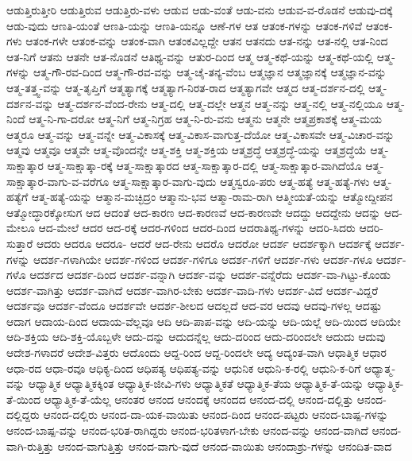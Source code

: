 {ಆಡುತ್ತಿರುತ್ತೀರಿ
ಆಡುತ್ತಿರುವ
ಆಡುತ್ತಿರು-ವಳು
ಆಡುವ
ಆಡು-ವಂತೆ
ಆಡು-ವನು
ಆಡುವ-ವ-ರೊಡನೆ
ಆಡುವು-ದಕ್ಕೆ
ಆಡು-ವುದು
ಆಣತಿ-ಯಂತೆ
ಆಣತಿ-ಯನ್ನು
ಆಣತಿ-ಯನ್ನೂ
ಆಣೆ-ಗಳ
ಆತ
ಆತಂಕ-ಗಳನ್ನು
ಆತಂಕ-ಗಳಿವೆ
ಆತಂಕ-ಗಳು
ಆತಂಕ-ಗಳೇ
ಆತಂಕ-ವನ್ನು
ಆತಂಕ-ವಾಗಿ
ಆತಂಕವಿಲ್ಲದ್ದೇ
ಆತನ
ಆತನದು
ಆತ-ನನ್ನು
ಆತ-ನಲ್ಲಿ
ಆತ-ನಿಂದ
ಆತ-ನಿಗೆ
ಆತನು
ಆತನೇ
ಆತ-ನೊಡನೆ
ಆತಿಥ್ಯ-ವನ್ನು
ಆತುರ-ದಿಂದ
ಆತ್ಮ
ಆತ್ಮ-ಕಥೆ-ಯನ್ನು
ಆತ್ಮ-ಕಥೆ-ಯಲ್ಲಿ
ಆತ್ಮ-ಗಳನ್ನು
ಆತ್ಮ-ಗೌ-ರವ-ದಿಂದ
ಆತ್ಮ-ಗೌ-ರವ-ವನ್ನು
ಆತ್ಮ-ಚೈ-ತನ್ಯ-ವೆಂಬ
ಆತ್ಮಜ್ಞಾನ
ಆತ್ಮಜ್ಞಾನಕ್ಕೆ
ಆತ್ಮಜ್ಞಾನ-ವನ್ನು
ಆತ್ಮ-ತತ್ತ್ವ-ವನ್ನು
ಆತ್ಮ-ತೃಪ್ತಿಗೆ
ಆತ್ಮತ್ಯಾಗಕ್ಕೆ
ಆತ್ಮತ್ಯಾಗ-ನಿರತ-ರಾದ
ಆತ್ಮತ್ಯಾಗವೇ
ಆತ್ಮದ
ಆತ್ಮ-ದರ್ಶನ-ದಲ್ಲಿ
ಆತ್ಮ-ದರ್ಶನ-ವನ್ನು
ಆತ್ಮ-ದರ್ಶನ-ವೆಂದ-ರೇನು
ಆತ್ಮ-ದಲ್ಲಿ
ಆತ್ಮ-ದಲ್ಲೇ
ಆತ್ಮನ
ಆತ್ಮ-ನನ್ನು
ಆತ್ಮ-ನಲ್ಲಿ
ಆತ್ಮ-ನಲ್ಲಿಯೂ
ಆತ್ಮ-ನಿಂದೆ
ಆತ್ಮ-ನಿ-ಗಾ-ದರೋ
ಆತ್ಮ-ನಿಗೆ
ಆತ್ಮ-ನಿಗ್ರಹ
ಆತ್ಮ-ನಿ-ರು-ವನು
ಆತ್ಮನು
ಆತ್ಮನೇ
ಆತ್ಮಪ್ರಕಾಶಕ್ಕೆ
ಆತ್ಮ-ಮಯ
ಆತ್ಮರೂ
ಆತ್ಮ-ವನ್ನು
ಆತ್ಮ-ವನ್ನೇ
ಆತ್ಮ-ವಿಕಾಸಕ್ಕೆ
ಆತ್ಮ-ವಿಕಾಸ-ವಾಗುತ್ತ-ದೆಯೋ
ಆತ್ಮ-ವಿಕಾಸವೇ
ಆತ್ಮ-ವಿಚಾರ-ವನ್ನು
ಆತ್ಮವು
ಆತ್ಮವೂ
ಆತ್ಮವೇ
ಆತ್ಮ-ವೊಂದನ್ನೇ
ಆತ್ಮ-ಶಕ್ತಿ
ಆತ್ಮ-ಶಕ್ತಿಯ
ಆತ್ಮಶ್ರದ್ಧೆ
ಆತ್ಮಶ್ರದ್ಧೆ-ಯನ್ನು
ಆತ್ಮಶ್ರದ್ಧೆಯೆ
ಆತ್ಮ-ಸಾಕ್ಷಾತ್ಕಾರ
ಆತ್ಮ-ಸಾಕ್ಷಾತ್ಕಾ-ರಕ್ಕೆ
ಆತ್ಮ-ಸಾಕ್ಷಾತ್ಕಾರದ
ಆತ್ಮ-ಸಾಕ್ಷಾತ್ಕಾರ-ದಲ್ಲಿ
ಆತ್ಮ-ಸಾಕ್ಷಾತ್ಕಾರ-ವಾಗಿದೆಯೊ
ಆತ್ಮ-ಸಾಕ್ಷಾತ್ಕಾರ-ವಾಗು-ವ-ವರೆಗೂ
ಆತ್ಮ-ಸಾಕ್ಷಾತ್ಕಾರ-ವಾಗು-ವುದು
ಆತ್ಮಸ್ವರೂ-ಪರು
ಆತ್ಮ-ಹತ್ಯೆ
ಆತ್ಮ-ಹತ್ಯೆ-ಗಳು
ಆತ್ಮ-ಹತ್ಯೆಗೆ
ಆತ್ಮ-ಹತ್ಯೆ-ಯನ್ನು
ಆತ್ಮಾನ-ಮಚ್ಛಿದ್ರಂ
ಆತ್ಮಾನು-ಭವ
ಆತ್ಮಾ-ರಾಮ-ರಾಗಿ
ಆತ್ಮೀಯತೆ-ಯನ್ನು
ಆತ್ಮೋದ್ದೀಪನ
ಆತ್ಮೋದ್ಧಾರಕ್ಕೋಸುಗ
ಆದ
ಆದಂತೆ
ಆದ-ಕಾರಣ
ಆದ-ಕಾರಣವೆ
ಆದ-ಕಾರಣವೇ
ಆದದ್ದು
ಆದದ್ದೇನು
ಆದನ್ನು
ಆದ-ಮೇಲೂ
ಆದ-ಮೇಲೆ
ಆದರ
ಆದ-ರಕ್ಕೆ
ಆದರ-ಗಳಿಂದ
ಆದರ-ದಿಂದ
ಆದರಾತಿಥ್ಯ-ಗಳನ್ನು
ಆದರಿ-ಸಿದರು
ಆದರಿ-ಸುತ್ತಾರೆ
ಆದರು
ಆದರೂ
ಆದರೂ-
ಆದರೆ
ಆದ-ರೇನು
ಆದರೊ
ಆದರೋ
ಆದರ್ಶ
ಆದರ್ಶಕ್ಕಾಗಿ
ಆದರ್ಶಕ್ಕೆ
ಆದರ್ಶ-ಗಳನ್ನು
ಆದರ್ಶ-ಗಳಾಗಿಯೇ
ಆದರ್ಶ-ಗಳಿಂದ
ಆದರ್ಶ-ಗಳಿಗೂ
ಆದರ್ಶ-ಗಳಿಗೆ
ಆದರ್ಶ-ಗಳು
ಆದರ್ಶ-ಗಳೂ
ಆದರ್ಶ-ಗಳೊ
ಆದರ್ಶದ
ಆದರ್ಶ-ದಿಂದ
ಆದರ್ಶ-ವನ್ನಾಗಿ
ಆದರ್ಶ-ವನ್ನು
ಆದರ್ಶ-ವನ್ನೆರೆದು
ಆದರ್ಶ-ವಾ-ಗಿಟ್ಟು-ಕೊಂಡು
ಆದರ್ಶ-ವಾಗಿತ್ತು
ಆದರ್ಶ-ವಾಗಿದೆ
ಆದರ್ಶ-ವಾಗಿರ-ಬೇಕು
ಆದರ್ಶ-ವಾದಿ-ಗಳು
ಆದರ್ಶ-ವಿದೆ
ಆದರ್ಶ-ವಿದ್ದರೆ
ಆದರ್ಶವೂ
ಆದರ್ಶ-ವೆಂದೂ
ಆದರ್ಶವೇ
ಆದರ್ಶ-ಶೀಲದ
ಆದಲ್ಲದೆ
ಆದ-ವರ
ಆದವು
ಆದವು-ಗಳಲ್ಲ
ಆದಷ್ಟು
ಆದಾಗ
ಆದಾಯ-ದಿಂದ
ಆದಾಯ-ವೆಲ್ಲವೂ
ಆದಿ
ಆದಿ-ಪಾಪ-ವನ್ನು
ಆದಿ-ಯನ್ನು
ಆದಿ-ಯಲ್ಲೆ
ಆದಿ-ಯಿಂದ
ಆದಿಯೇ
ಆದಿ-ಶಕ್ತಿಯ
ಆದಿ-ಶಕ್ತಿ-ಯೊಬ್ಬಳೇ
ಆದು-ದನ್ನು
ಆದುದನ್ನೆಲ್ಲ
ಆದು-ದರಿಂದ
ಆದು-ದರಿಂದಲೇ
ಆದುದು
ಆದುವು
ಆದೇಶ-ಗಳಾದರೆ
ಆದೇಶ-ವಿತ್ತರು
ಆದೊಂದು
ಆದ್ದ-ರಿಂದ
ಆದ್ದ-ರಿಂದಲೇ
ಆದ್ಯ
ಆದ್ಯಂತ-ವಾಗಿ
ಆಧಾತ್ಮಿಕ
ಆಧಾರ
ಆಧಾ-ರದ
ಆಧಾ-ರವೂ
ಆಧಿಕ್ಯ-ದಿಂದ
ಆಧಿಪತ್ಯ
ಆಧಿಪತ್ಯ-ವನ್ನು
ಆಧುನಿಕ
ಆಧುನಿ-ಕ-ರಲ್ಲಿ
ಆಧುನಿ-ಕ-ರಿಗೆ
ಆಧ್ಯಾತ್ಮ-ವನ್ನು
ಆಧ್ಯಾತ್ಮಿಕ
ಆಧ್ಯಾತ್ಮಿಕಕ್ಕಿಂತ
ಆಧ್ಯಾತ್ಮಿಕ-ಜೀವಿ-ಗಳು
ಆಧ್ಯಾತ್ಮಿಕತೆ
ಆಧ್ಯಾತ್ಮಿಕ-ತೆಯ
ಆಧ್ಯಾತ್ಮಿಕ-ತೆ-ಯನ್ನು
ಆಧ್ಯಾತ್ಮಿಕ-ತೆ-ಯಿಂದ
ಆಧ್ಯಾತ್ಮಿಕ-ತೆ-ಯೆಲ್ಲ
ಆನಂತರ
ಆನಂದ
ಆನಂದಕ್ಕೆ
ಆನಂದದ
ಆನಂದ-ದಲ್ಲಿ
ಆನಂದ-ದಲ್ಲಿತ್ತು
ಆನಂದ-ದಲ್ಲಿದ್ದರು
ಆನಂದ-ದಲ್ಲಿರು
ಆನಂದ-ದಾ-ಯಕ-ವಾಯಿತು
ಆನಂದ-ದಿಂದ
ಆನಂದ-ಪಟ್ಟರು
ಆನಂದ-ಬಾಷ್ಪ-ಗಳನ್ನು
ಆನಂದ-ಬಾಷ್ಪ-ವನ್ನು
ಆನಂದ-ಭರಿತ-ರಾಗಿದ್ದರು
ಆನಂದ-ಭರಿತಳಾಗ-ಬೇಕು
ಆನಂದ-ವನ್ನು
ಆನಂದ-ವಾಗಿದೆ
ಆನಂದ-ವಾಗಿ-ರುತ್ತಿತ್ತು
ಆನಂದ-ವಾಗುತ್ತಿತ್ತು
ಆನಂದ-ವಾಗು-ವುದೆ
ಆನಂದ-ವಾಯಿತು
ಆನಂದಾಶ್ರು-ಗಳನ್ನು
ಆನಂದಿತ-ವಾದ
}
